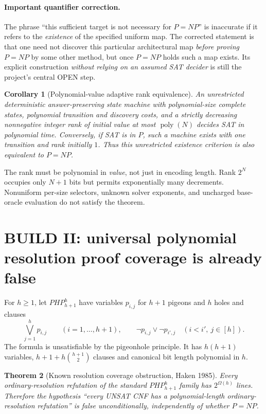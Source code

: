 \documentclass[11pt]{article}
\newtheorem{theorem}{Theorem}
\newtheorem{corollary}[theorem]{Corollary}
\begin{document}
\paragraph{Important quantifier correction.}
The phrase ``this sufficient target is not necessary for $P=NP$'' is inaccurate if it refers to the \emph{existence} of the specified uniform map. The corrected statement is that one need not discover this particular architectural map \emph{before proving} $P=NP$ by some other method, but once $P=NP$ holds such a map exists. Its explicit construction \emph{without relying on an assumed SAT decider} is still the project's central OPEN step.

\begin{corollary}[Polynomial-value adaptive rank equivalence]
An unrestricted deterministic answer-preserving state machine with polynomial-size complete states, polynomial transition and discovery costs, and a strictly decreasing nonnegative integer rank of initial value at most $\operatorname{poly}(N)$ decides SAT in polynomial time. Conversely, if SAT is in $P$, such a machine exists with one transition and rank initially $1$. Thus this \emph{unrestricted existence} criterion is also equivalent to $P=NP$.
\end{corollary}
The rank must be polynomial in \emph{value}, not just in encoding length. Rank $2^N$ occupies only $N+1$ bits but permits exponentially many decrements. Nonuniform per-size selectors, unknown solver exponents, and uncharged base-oracle evaluation do not satisfy the theorem.

\section{BUILD II: universal polynomial resolution proof coverage is already false}
For $h\ge1$, let $PHP_{h+1}^{h}$ have variables $p_{i,j}$ for $h+1$ pigeons and $h$ holes and clauses
\[
 \bigvee_{j=1}^{h} p_{i,j}\qquad(i=1,\ldots,h+1),
 \qquad \neg p_{i,j}\vee\neg p_{i',j}\quad(i<i',\ j\in[h]).
\]
The formula is unsatisfiable by the pigeonhole principle. It has $h(h+1)$ variables, $h+1+h\binom{h+1}{2}$ clauses and canonical bit length polynomial in $h$.
\begin{theorem}[Known resolution coverage obstruction, Haken 1985]
Every ordinary-resolution refutation of the standard $PHP_{h+1}^{h}$ family has $2^{\Omega(h)}$ lines. Therefore the hypothesis ``every UNSAT CNF has a polynomial-length ordinary-resolution refutation'' is false unconditionally, independently of whether $P=NP$.
\end{theorem}
\end{document}
